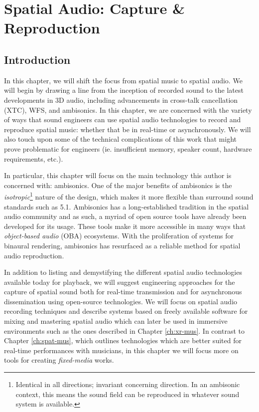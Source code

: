 \chapter{Spatial Audio: Capture \& Reproduction} \label{ch:spat-aud}


\section{Introduction}

In this chapter, we will shift the focus from spatial music to spatial audio. We will begin by drawing a line from the inception of recorded sound to the latest developments in 3D audio, including advancements in cross-talk cancellation (XTC), WFS, and ambisonics. In this chapter, we are concerned with the variety of ways that sound engineers can use spatial audio technologies to record and reproduce spatial music: whether that be in real-time or asynchronously. We will also touch upon some of the technical complications of this work that might prove problematic for engineers (ie. insufficient memory, speaker count, hardware requirements, etc.).

In particular, this chapter will focus on the main technology this author is concerned with: ambisonics. One of the major benefits of ambisonics is the \textit{isotropic}\footnote{Identical in all directions; invariant concerning direction. In an ambisonic context, this means the sound field can be reproduced in whatever sound system is available.} nature of the design, which makes it more flexible than surround sound standards such as 5.1. Ambisonics has a long-established tradition in the spatial audio community and as such, a myriad of open source tools have already been developed for its usage. These tools make it more accessible in many ways that \textit{object-based audio} (OBA) ecosystems. With the proliferation of systems for binaural rendering, ambisonics has resurfaced as a reliable method for spatial audio reproduction.

In addition to listing and demystifying the different spatial audio technologies available today for playback, we will suggest engineering approaches for the capture of spatial sound both for real-time transmission and for asynchronous dissemination using open-source technologies. We will focus on spatial audio recording techniques and describe systems based on freely available software for mixing and mastering spatial audio which can later be used in immersive environments such as the ones described in Chapter \ref{ch:xr-mus}. In contrast to Chapter \ref{ch:spat-mus}, which outlines technologies which are better suited for real-time performances with musicians, in this chapter we will focus more on tools for creating \textit{fixed-media} works.


